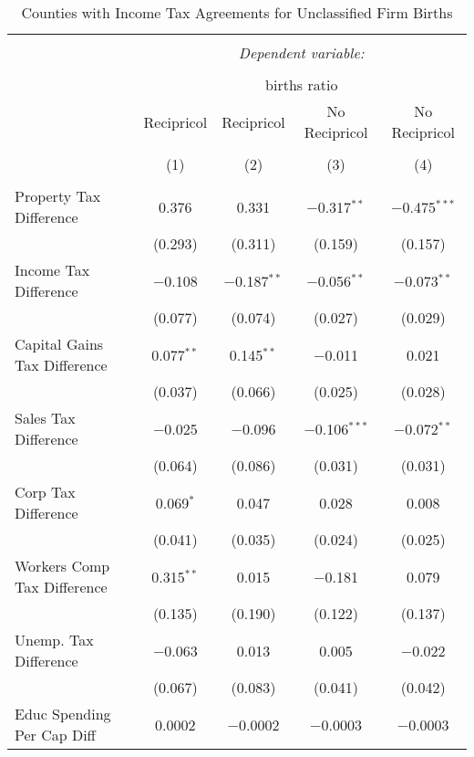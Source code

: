 
\begin{table}[!htbp] \centering 
  \caption{Counties with Income Tax Agreements for  Unclassified Firm Births} 
  \label{99agreement} 
\begin{tabular}{@{\extracolsep{5pt}}lcccc} 
\\[-1.8ex]\hline 
\hline \\[-1.8ex] 
 & \multicolumn{4}{c}{\textit{Dependent variable:}} \\ 
\cline{2-5} 
\\[-1.8ex] & \multicolumn{4}{c}{births ratio} \\ 
 & Recipricol & Recipricol & No Recipricol & No Recipricol \\ 
\\[-1.8ex] & (1) & (2) & (3) & (4)\\ 
\hline \\[-1.8ex] 
 Property Tax Difference & 0.376 & 0.331 & $-$0.317$^{**}$ & $-$0.475$^{***}$ \\ 
  & (0.293) & (0.311) & (0.159) & (0.157) \\ 
  Income Tax Difference & $-$0.108 & $-$0.187$^{**}$ & $-$0.056$^{**}$ & $-$0.073$^{**}$ \\ 
  & (0.077) & (0.074) & (0.027) & (0.029) \\ 
  Capital Gains Tax Difference & 0.077$^{**}$ & 0.145$^{**}$ & $-$0.011 & 0.021 \\ 
  & (0.037) & (0.066) & (0.025) & (0.028) \\ 
  Sales Tax Difference & $-$0.025 & $-$0.096 & $-$0.106$^{***}$ & $-$0.072$^{**}$ \\ 
  & (0.064) & (0.086) & (0.031) & (0.031) \\ 
  Corp Tax Difference & 0.069$^{*}$ & 0.047 & 0.028 & 0.008 \\ 
  & (0.041) & (0.035) & (0.024) & (0.025) \\ 
  Workers Comp Tax Difference & 0.315$^{**}$ & 0.015 & $-$0.181 & 0.079 \\ 
  & (0.135) & (0.190) & (0.122) & (0.137) \\ 
  Unemp. Tax Difference & $-$0.063 & 0.013 & 0.005 & $-$0.022 \\ 
  & (0.067) & (0.083) & (0.041) & (0.042) \\ 
  Educ Spending Per Cap Diff & 0.0002 & $-$0.0002 & $-$0.0003 & $-$0.0003 \\ 

\end{tabular}
\end{table}
